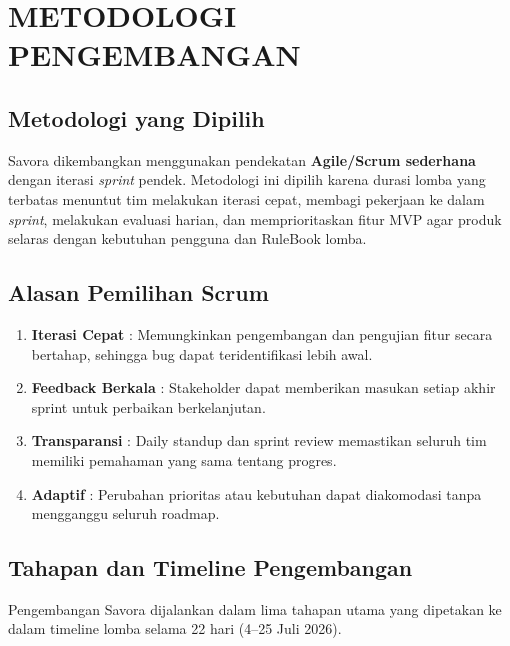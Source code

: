 \section{METODOLOGI PENGEMBANGAN}

\subsection{Metodologi yang Dipilih}

Savora dikembangkan menggunakan pendekatan \textbf{Agile/Scrum sederhana} dengan iterasi
\textit{sprint} pendek. Metodologi ini dipilih karena durasi lomba yang terbatas menuntut tim
melakukan iterasi cepat, membagi pekerjaan ke dalam \textit{sprint}, melakukan evaluasi harian,
dan memprioritaskan fitur MVP agar produk selaras dengan kebutuhan pengguna dan RuleBook lomba.

\subsection{Alasan Pemilihan Scrum}

\begin{enumerate}[leftmargin=*]
    \item \textbf{Iterasi Cepat} : Memungkinkan pengembangan dan pengujian fitur secara bertahap, sehingga bug dapat teridentifikasi lebih awal.
    \item \textbf{Feedback Berkala} : Stakeholder dapat memberikan masukan setiap akhir sprint untuk perbaikan berkelanjutan.
    \item \textbf{Transparansi} : Daily standup dan sprint review memastikan seluruh tim memiliki pemahaman yang sama tentang progres.
    \item \textbf{Adaptif} : Perubahan prioritas atau kebutuhan dapat diakomodasi tanpa mengganggu seluruh roadmap.
\end{enumerate}

\subsection{Tahapan dan Timeline Pengembangan}

Pengembangan Savora dijalankan dalam lima tahapan utama yang dipetakan ke dalam timeline lomba
selama 22 hari (4--25 Juli 2026).

